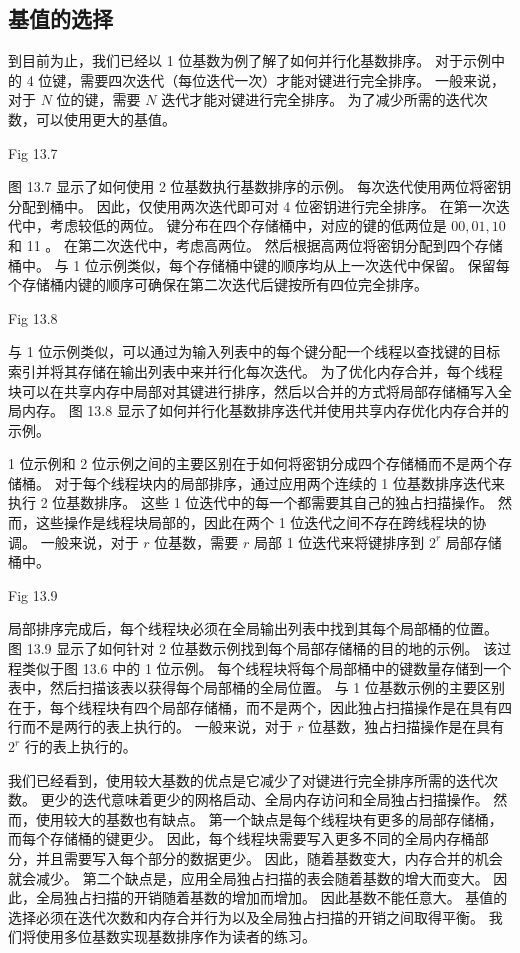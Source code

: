 \subsection{基值的选择}
到目前为止，我们已经以 1 位基数为例了解了如何并行化基数排序。 
对于示例中的 4 位键，需要四次迭代（每位迭代一次）才能对键进行完全排序。 
一般来说，对于 $N$ 位的键，需要 $N$ 迭代才能对键进行完全排序。 为了减少所需的迭代次数，可以使用更大的基值。

{\color{red} Fig 13.7}

图 13.7 显示了如何使用 2 位基数执行基数排序的示例。 每次迭代使用两位将密钥分配到桶中。 
因此，仅使用两次迭代即可对 4 位密钥进行完全排序。 在第一次迭代中，考虑较低的两位。 
键分布在四个存储桶中，对应的键的低两位是 $00,01,10$ 和 11 。 在第二次迭代中，考虑高两位。 
然后根据高两位将密钥分配到四个存储桶中。 与 1 位示例类似，每个存储桶中键的顺序均从上一次迭代中保留。 
保留每个存储桶内键的顺序可确保在第二次迭代后键按所有四位完全排序。

{\color{red} Fig 13.8}

与 1 位示例类似，可以通过为输入列表中的每个键分配一个线程以查找键的目标索引并将其存储在输出列表中来并行化每次迭代。 
为了优化内存合并，每个线程块可以在共享内存中局部对其键进行排序，然后以合并的方式将局部存储桶写入全局内存。 
图 13.8 显示了如何并行化基数排序迭代并使用共享内存优化内存合并的示例。

1 位示例和 2 位示例之间的主要区别在于如何将密钥分成四个存储桶而不是两个存储桶。 
对于每个线程块内的局部排序，通过应用两个连续的 1 位基数排序迭代来执行 2 位基数排序。 
这些 1 位迭代中的每一个都需要其自己的独占扫描操作。 
然而，这些操作是线程块局部的，因此在两个 1 位迭代之间不存在跨线程块的协调。 
一般来说，对于 $r$ 位基数，需要 $r$ 局部 1 位迭代来将键排序到 $2^{r}$ 局部存储桶中。

{\color{red} Fig 13.9}

局部排序完成后，每个线程块必须在全局输出列表中找到其每个局部桶的位置。 
图 13.9 显示了如何针对 2 位基数示例找到每个局部存储桶的目的地的示例。 该过程类似于图 13.6 中的 1 位示例。 
每个线程块将每个局部桶中的键数量存储到一个表中，然后扫描该表以获得每个局部桶的全局位置。 
与 1 位基数示例的主要区别在于，每个线程块有四个局部存储桶，而不是两个，因此独占扫描操作是在具有四行而不是两行的表上执行的。 
一般来说，对于 $r$ 位基数，独占扫描操作是在具有 $2^{r}$ 行的表上执行的。

我们已经看到，使用较大基数的优点是它减少了对键进行完全排序所需的迭代次数。 
更少的迭代意味着更少的网格启动、全局内存访问和全局独占扫描操作。 然而，使用较大的基数也有缺点。 
第一个缺点是每个线程块有更多的局部存储桶，而每个存储桶的键更少。 
因此，每个线程块需要写入更多不同的全局内存桶部分，并且需要写入每个部分的数据更少。 
因此，随着基数变大，内存合并的机会就会减少。 第二个缺点是，应用全局独占扫描的表会随着基数的增大而变大。 
因此，全局独占扫描的开销随着基数的增加而增加。 因此基数不能任意大。 
基值的选择必须在迭代次数和内存合并行为以及全局独占扫描的开销之间取得平衡。 我们将使用多位基数实现基数排序作为读者的练习。

